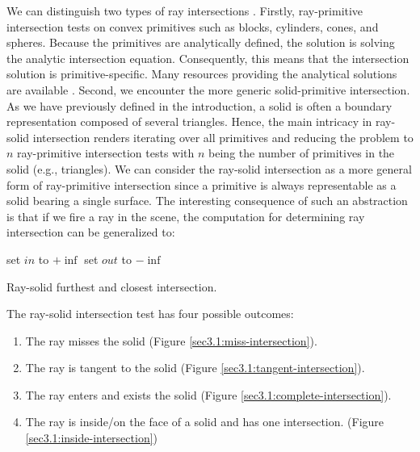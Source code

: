\documentclass[a4paper,11pt,oneside]{article}
\begin{document}
We can distinguish two types of ray intersections \cite{rasterization_scratch_pixel}. Firstly, ray-primitive intersection tests on convex primitives such as blocks, cylinders, cones, and spheres. Because the primitives are analytically defined, the solution is solving the analytic intersection equation. Consequently, this means that the intersection solution is primitive-specific. Many resources providing the analytical solutions are available \cite{ray_primitive_intersections}.
Second, we encounter the more generic solid-primitive intersection. As we have previously defined in the introduction, a solid is often a boundary representation composed of several triangles. Hence, the main intricacy in ray-solid intersection renders iterating over all primitives and reducing the problem to $n$ ray-primitive intersection tests with $n$ being the number of primitives in the solid (e.g., triangles).
We can consider the ray-solid intersection as a more general form of ray-primitive intersection since a primitive is always representable as a solid bearing a single surface. The interesting consequence of such an abstraction is that if we fire a ray in the scene, the computation for determining ray intersection can be generalized to:

\begin{algorithm}[H]
	\SetAlgoLined
	set $in$ to $+\inf$\;
	set $out$ to $-\inf$\;
	\caption{Ray-solid furthest and closest intersection.}
\end{algorithm}

The ray-solid intersection test has four possible outcomes:
\begin{enumerate}
	\item The ray misses the solid (Figure \ref{sec3.1:miss-intersection}).
	\item The ray is tangent to the solid (Figure \ref{sec3.1:tangent-intersection}).
	\item The ray enters and exists the solid (Figure \ref{sec3.1:complete-intersection}).
	\item The ray is inside/on the face of a solid and has one intersection. (Figure \ref{sec3.1:inside-intersection})
\end{enumerate}
\end{document}
